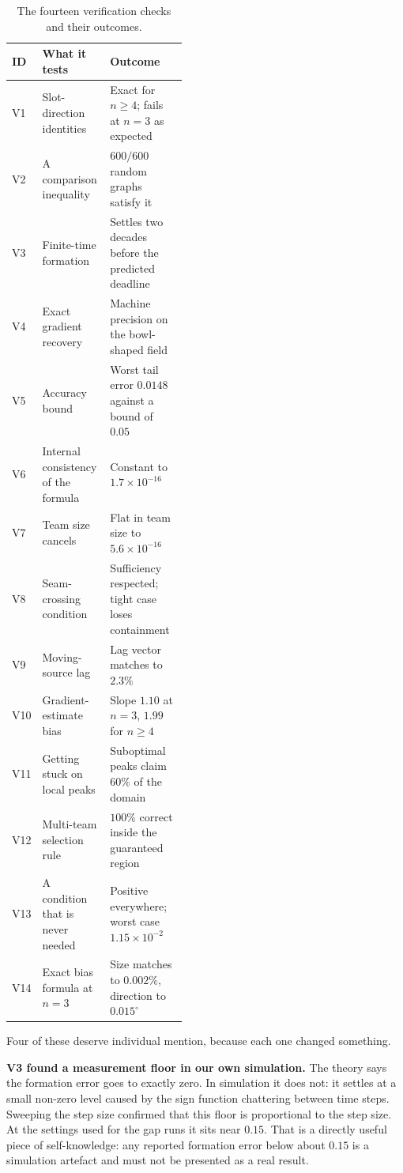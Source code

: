 \documentclass[11pt,a4paper]{article}
\begin{document}
\begin{table}[H]
\centering
\caption{The fourteen verification checks and their outcomes.}
\label{tab:checks}
\small
\begin{tabular}{@{}llp{0.44\linewidth}@{}}
\toprule
ID & What it tests & Outcome \\
\midrule
V1 & Slot-direction identities & Exact for $n \geq 4$; fails at $n = 3$ as expected \\
V2 & A comparison inequality & $600/600$ random graphs satisfy it \\
V3 & Finite-time formation & Settles two decades before the predicted deadline \\
V4 & Exact gradient recovery & Machine precision on the bowl-shaped field \\
V5 & Accuracy bound & Worst tail error $0.0148$ against a bound of $0.05$ \\
V6 & Internal consistency of the formula & Constant to $1.7 \times 10^{-16}$ \\
V7 & Team size cancels & Flat in team size to $5.6 \times 10^{-16}$ \\
V8 & Seam-crossing condition & Sufficiency respected; tight case loses containment \\
V9 & Moving-source lag & Lag vector matches to $2.3\%$ \\
V10 & Gradient-estimate bias & Slope $1.10$ at $n=3$, $1.99$ for $n \geq 4$ \\
V11 & Getting stuck on local peaks & Suboptimal peaks claim $60\%$ of the domain \\
V12 & Multi-team selection rule & $100\%$ correct inside the guaranteed region \\
V13 & A condition that is never needed & Positive everywhere; worst case $1.15\times10^{-2}$ \\
V14 & Exact bias formula at $n=3$ & Size matches to $0.002\%$, direction to $0.015^\circ$ \\
\bottomrule
\end{tabular}
\end{table}

Four of these deserve individual mention, because each one changed something.

\textbf{V3 found a measurement floor in our own simulation.} The theory says the formation error
goes to exactly zero. In simulation it does not: it settles at a small non-zero level caused by the
sign function chattering between time steps. Sweeping the step size confirmed that this floor is
proportional to the step size. At the settings used for the gap runs it sits near $0.15$. That is a
directly useful piece of self-knowledge: any reported formation error below about $0.15$ is a
simulation artefact and must not be presented as a real result.
\end{document}
